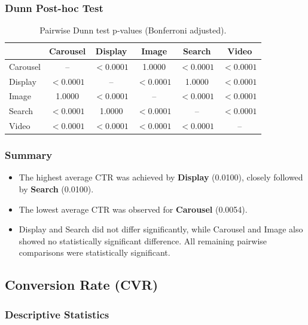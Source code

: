 \vspace{0.3cm}

\subsubsection{Dunn Post-hoc Test}

\begin{table}[H]
	\centering
	\caption{Pairwise Dunn test p-values (Bonferroni adjusted).}
	\begin{tabular}{lccccc}
		\toprule
		& Carousel & Display & Image & Search & Video \\
		\midrule
		Carousel & -- & $<0.0001$ & 1.0000 & $<0.0001$ & $<0.0001$ \\
		Display & $<0.0001$ & -- & $<0.0001$ & 1.0000 & $<0.0001$ \\
		Image & 1.0000 & $<0.0001$ & -- & $<0.0001$ & $<0.0001$ \\
		Search & $<0.0001$ & 1.0000 & $<0.0001$ & -- & $<0.0001$ \\
		Video & $<0.0001$ & $<0.0001$ & $<0.0001$ & $<0.0001$ & -- \\
		\bottomrule
	\end{tabular}
\end{table}

\subsubsection{Summary}

\begin{itemize}
	\item The highest average CTR was achieved by \textbf{Display} (0.0100), closely followed by \textbf{Search} (0.0100).
	\item The lowest average CTR was observed for \textbf{Carousel} (0.0054).
	\item Display and Search did not differ significantly, while Carousel and Image also showed no statistically significant difference. All remaining pairwise comparisons were statistically significant.
\end{itemize}

\subsection{Conversion Rate (CVR)}\label{appendix:creative_performance_analysis_CVR}

\subsubsection{Descriptive Statistics}

